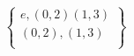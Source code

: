 \documentclass[preview]{standalone}
\begin{document}
\begin{align*}
\begin{Bmatrix}e,(0,2)(1,3)\\     (0,2),     (1,3)\\\end{Bmatrix}
\end{align*}
\end{document}
